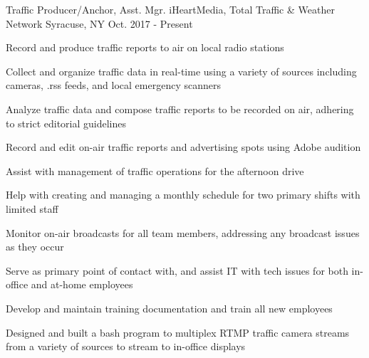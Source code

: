 


\begin{cventries}


\cventry
{Traffic Producer/Anchor, Asst. Mgr.} %
{iHeartMedia, Total Traffic \& Weather Network} %
{Syracuse, NY} %
{Oct. 2017 - Present} %
{
\begin{cvitems}
\setlength{\itemsep}{1ex} %
%
\item {Record and produce traffic reports to air on local radio stations}
    \begin{cvitemsnested}
    \item {Collect and organize traffic data in real-time using a variety of sources including cameras, .rss feeds, and local emergency scanners}
    \item {Analyze traffic data and compose traffic reports to be recorded on air, adhering to strict editorial guidelines}
    \item {Record and edit on-air traffic reports and advertising spots using Adobe audition}
    \end{cvitemsnested}
%
\item {Assist with management of traffic operations for the afternoon drive}
    \begin{cvitemsnested}
    \item {Help with creating and managing a monthly schedule for two primary shifts with limited staff}
    \item {Monitor on-air broadcasts for all team members, addressing any broadcast issues as they occur}
    \item {Serve as primary point of contact with, and assist IT with tech issues for both in-office and at-home employees}
    \item {Develop and maintain training documentation and train all new employees}
    \end{cvitemsnested}
%
\item {Designed and built a bash program to multiplex RTMP traffic camera streams from a variety of sources to stream to in-office displays}
\end{cvitems}
}


\end{cventries}
